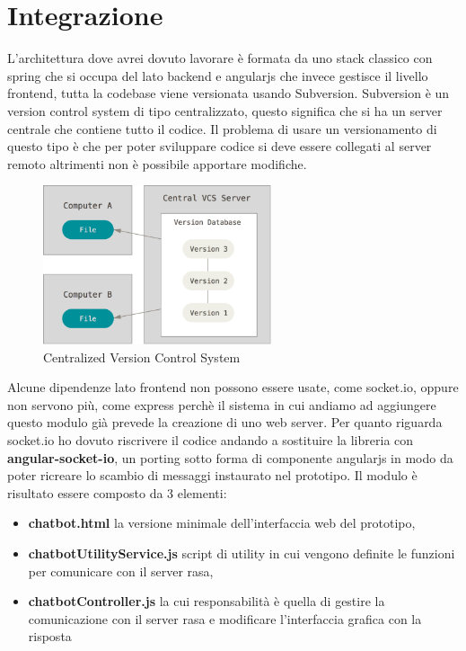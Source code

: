 \chapter{Integrazione}

L'architettura dove avrei dovuto lavorare è formata da uno stack classico con spring che si occupa del lato backend e angularjs che invece gestisce il livello frontend, tutta la codebase viene versionata usando Subversion. Subversion è un version control system di tipo centralizzato, questo significa che si ha un server centrale che contiene tutto il codice. Il problema di usare un versionamento di questo tipo è che per poter sviluppare codice si deve essere collegati al server remoto altrimenti non è possibile apportare modifiche.
\begin{figure}[H]
    \centering
    \includegraphics[width=0.6\textwidth]{img/centralized.png}
    \caption{Centralized Version Control System}
\end{figure}
Alcune dipendenze lato frontend non possono essere usate, come socket.io, oppure non servono più, come express perchè il sistema in cui andiamo ad aggiungere questo modulo già prevede la creazione di uno web server. Per quanto riguarda socket.io ho dovuto riscrivere il codice andando a sostituire la libreria con \textbf{angular-socket-io}, un porting sotto forma di componente angularjs in modo da poter ricreare lo scambio di messaggi instaurato nel prototipo.
Il modulo è risultato essere composto da 3 elementi: 
\begin{itemize}
  \item \textbf{chatbot.html} la versione minimale dell'interfaccia web del prototipo,
  \item \textbf{chatbotUtilityService.js} script di utility in cui vengono definite le funzioni per comunicare con il server rasa,
  \item \textbf{chatbotController.js} la cui responsabilità è quella di gestire la comunicazione con il server rasa e modificare l'interfaccia grafica con la risposta
\end{itemize}
